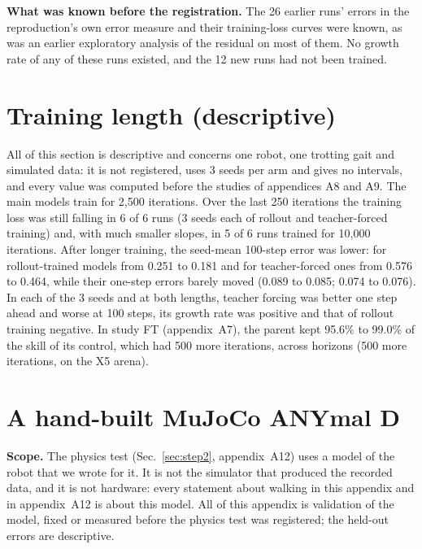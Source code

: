\textbf{What was known before the registration.} The 26 earlier runs' errors in the reproduction's own
error measure and their training-loss curves were known, as was an earlier exploratory analysis of the residual on
most of them. No
growth rate of any of these runs existed, and the 12 new runs had not been trained.

\FloatBarrier
\section{Training length (descriptive)}\label{app:A10}
All of this section is descriptive and concerns one robot, one trotting gait and simulated data: it is not registered, uses 3 seeds per arm and gives no intervals, and every
value was computed before the studies of appendices A8 and A9. The main models train for 2{,}500 iterations. Over the last 250 iterations the
training loss was still falling in 6 of 6 runs (3 seeds each of
rollout and teacher-forced training) and, with much smaller slopes, in 5 of 6
runs trained for 10{,}000 iterations. After longer training, the seed-mean 100-step error was lower: for rollout-trained models
from 0.251 to 0.181 and for teacher-forced ones from 0.576 to
0.464, while their one-step errors barely moved (0.089 to 0.085;
0.074 to 0.076). In each of the 3 seeds and at both lengths, teacher
forcing was better one step ahead and worse at 100 steps, its growth rate was positive and that of rollout training
negative. In study FT (appendix~A7), the parent kept 95.6\% to 99.0\% of the skill of its control,
which had 500 more iterations, across horizons (500 more iterations, on the X5 arena).

\FloatBarrier
\section{A hand-built MuJoCo ANYmal D}\label{app:A11}
\textbf{Scope.} The physics test (Sec.~\ref{sec:step2}, appendix~A12) uses a model of the robot that we wrote for it.
It is not the simulator that produced the recorded data, and it is not hardware: every statement about walking in
this appendix and in appendix~A12 is about this model. All of this appendix is validation of the model, fixed or
measured before the physics test was registered; the held-out errors are descriptive.

